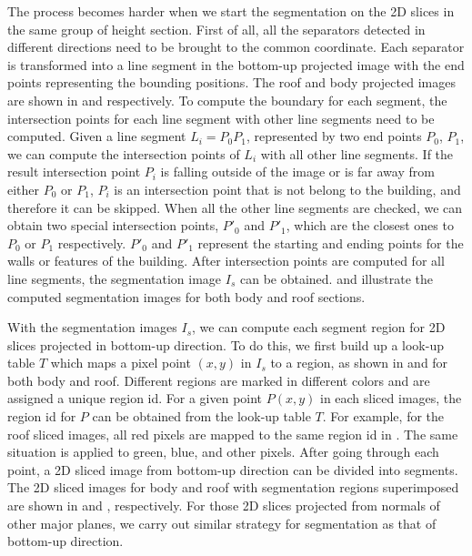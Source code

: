 The process becomes harder when we start the segmentation 
on the 2D slices in the same group of height section.
First of all, all the separators detected in different directions
need to be brought to the common coordinate.
Each separator is transformed into 
a line segment in the bottom-up projected image with the end points 
representing the bounding positions.
The roof and body projected images are shown in 
 and  respectively.
To compute the boundary for each segment,
the intersection points 
for each line segment with other line segments need to be computed.
%
Given a line segment $L_i = P_0P_1$, represented by two end points $P_0$, $P_1$, 
we can compute the intersection points of
$L_i$ with all other line segments. 
If the result intersection point $P_i$ is falling outside of the image or 
is far away from either $P_0$ or $P_1$, 
$P_i$ is an intersection point that is not belong to the building,
and therefore it can be skipped.
When all the other line segments are checked, 
we can obtain two special intersection points, $P'_0$ and $P'_1$, 
which are the closest ones to $P_0$ or $P_1$ respectively. 
$P'_0$ and $P'_1$ represent the starting and ending points
for the walls or features of the building.
After intersection points are computed for all line segments, 
the segmentation image $I_s$ can be obtained.
 and  illustrate the computed segmentation images
for both body and roof sections.

With the segmentation images $I_s$, 
we can compute each segment region for 2D slices projected in bottom-up direction.
To do this, we first build up a look-up table $T$ 
which maps a pixel point $(x, y)$ in $I_s$ to a region,
as shown in  and  for both body and roof. 
Different regions are marked in different colors 
and are assigned a unique region id. 
For a given point $P(x, y)$ in each sliced images, 
the region id for $P$ can be obtained from the look-up table $T$.
For example, for the roof sliced images,
all red pixels are mapped to the same region id in . 
The same situation is applied to green, blue, and other pixels.
After going through each point, a 2D sliced image from bottom-up direction
can be divided into segments. 
The 2D sliced images for body and roof
with segmentation regions superimposed 
are shown in  and , respectively.
For those 2D slices projected from normals of other major planes,
we carry out similar strategy for segmentation as that of bottom-up direction.



